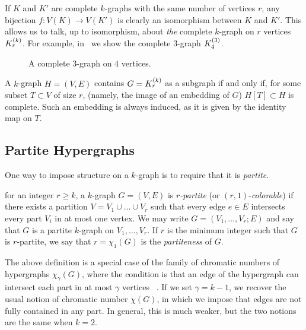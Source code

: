 If $K$ and $K'$ are complete $k$-graphs with the same number of vertices $r$,
any bijection $f: V(K) \to V(K')$ is clearly an isomorphism between $K$ and $K'$.
This allows us to talk, up to isomorphism, about \emph{the} complete $k$-graph on $r$ vertices $K^{(k)}_{r}$.
For example, in~ we show the complete $3$-graph $K^{(3)}_{4}$.

\begin{figure}[htbp]
    \centering
    
    \caption{A complete $3$-graph on $4$ vertices.}
    \label{fig:complete_kgraph}
\end{figure}

\begin{remark}
    A $k$-graph $H = (V, E)$ contains $G = K^{(k)}_{r}$ as a subgraph if and only if,
    for some subset $T \subset V$ of size $r$, (namely, the image of an embedding of $G$)
    $H[T] \subset H$ is complete.
    Such an embedding is always induced, as it is given by the identity map on $T$.
\end{remark}

\subsection{Partite Hypergraphs}\label{subsec:partite}

One way to impose structure on a $k$-graph is to require that it is \emph{partite}.

\begin{definition} \label{def:partite}
    for an integer $r \geq k$, a $k$-graph $G = (V, E)$ is \emph{$r$-partite}
    (or $(r, 1)$-\emph{colorable})
    if there exists a partition $V = V_1 \cup \dots \cup V_r$
    such that every edge $e \in E$ intersects every part $V_i$ in at most one vertex.
    We may write $G = (V_1, \dots, V_r; E)$ and say that
    $G$ is a partite $k$-graph on $V_1, \dots, V_r$.
    If $r$ is the minimum integer such that $G$ is $r$-partite,
    we say that $r = \chi_{1}(G)$ is the \emph{partiteness} of $G$.
\end{definition}

The above definition is a special case of the family of chromatic numbers of hypergraphs $\chi_{\gamma}(G)$,
where the condition is that an edge of the hypergraph can intersect each part in at most
$\gamma$ vertices ~\cite{krivelevich1998chromatic}.
If we set $\gamma = k - 1$, we recover the usual notion of chromatic number $\chi(G)$,
in which we impose that edges are not fully contained in any part.
In general, this is much weaker, but the two notions are the same when $k = 2$.


